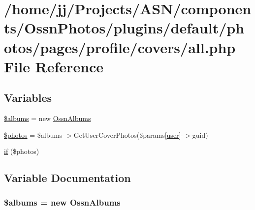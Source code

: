 \hypertarget{_ossn_photos_2plugins_2default_2photos_2pages_2profile_2covers_2all_8php}{}\section{/home/jj/\+Projects/\+A\+S\+N/components/\+Ossn\+Photos/plugins/default/photos/pages/profile/covers/all.php File Reference}
\label{_ossn_photos_2plugins_2default_2photos_2pages_2profile_2covers_2all_8php}
\subsection*{Variables}
\begin{DoxyCompactItemize}
\item 
\hyperlink{_ossn_photos_2plugins_2default_2photos_2pages_2profile_2covers_2all_8php_a23e8244caaacd14d608137a383e8f0e7}{\$albums} = new \hyperlink{class_ossn_albums}{Ossn\+Albums}
\item 
\hyperlink{_ossn_photos_2plugins_2default_2photos_2pages_2profile_2covers_2all_8php_a7d16539c7a3688bee1d3184c81c47487}{\$photos} = \$albums-\/$>$Get\+User\+Cover\+Photos(\$params\mbox{[}\textquotesingle{}\hyperlink{ossn_8config_8db_8example_8php_a802544b7ba9f79bbf24ef67773d53bed}{user}\textquotesingle{}\mbox{]}-\/$>$guid)
\item 
\hyperlink{_ossn_photos_2plugins_2default_2photos_2pages_2profile_2covers_2all_8php_a866f96068cd497b122fcd4efd2ebfff4}{if} (\$photos)
\end{DoxyCompactItemize}


\subsection{Variable Documentation}
\subsubsection[{\texorpdfstring{\$albums}{$albums}}]{\setlength{\rightskip}{0pt plus 5cm}\$albums = new {\bf Ossn\+Albums}}\hypertarget{_ossn_photos_2plugins_2default_2photos_2pages_2profile_2covers_2all_8php_a23e8244caaacd14d608137a383e8f0e7}{}\label{_ossn_photos_2plugins_2default_2photos_2pages_2profile_2covers_2all_8php_a23e8244caaacd14d608137a383e8f0e7}


